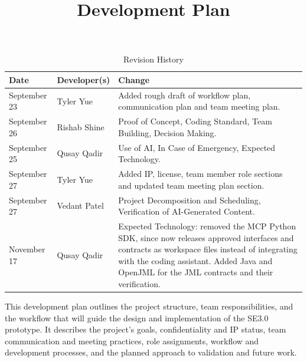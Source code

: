 \documentclass{article}
\title{Development Plan\\\progname}
\author{\authname}
\date{}
\begin{document}
\maketitle

\begin{table}[hp]
\caption{Revision History} \label{TblRevisionHistory}
\begin{tabularx}{\textwidth}{llX}
\toprule
\textbf{Date} & \textbf{Developer(s)} & \textbf{Change}\\
\midrule
September 23 & Tyler Yue & Added rough draft of workflow plan, communication plan and team meeting plan.\\
September 26 & Rishab Shine & Proof of Concept, Coding Standard, Team Building, Decision Making. \\
September 25 & Qusay Qadir & Use of AI, In Case of Emergency, Expected Technology. \\
September 27 & Tyler Yue & Added IP, license, team member role sections and updated team meeting plan section. \\
September 27 & Vedant Patel & Project Decomposition and Scheduling, Verification of AI-Generated Content. \\
November 17 & Qusay Qadir & Expected Technology: removed the MCP Python SDK, since \progname{} now releases approved interfaces and contracts as workspace files instead of integrating with the coding assistant. Added Java and OpenJML for the JML contracts and their verification. \\
\bottomrule
\end{tabularx}
\end{table}

\newpage{}



This development plan outlines the project structure, team responsibilities,
and the workflow that will guide the design and implementation of the SE3.0
prototype. It describes the project’s goals, confidentiality and IP status,
team communication and meeting practices, role assignments, workflow and
development processes, and the planned approach to validation and future work.

\end{document}
